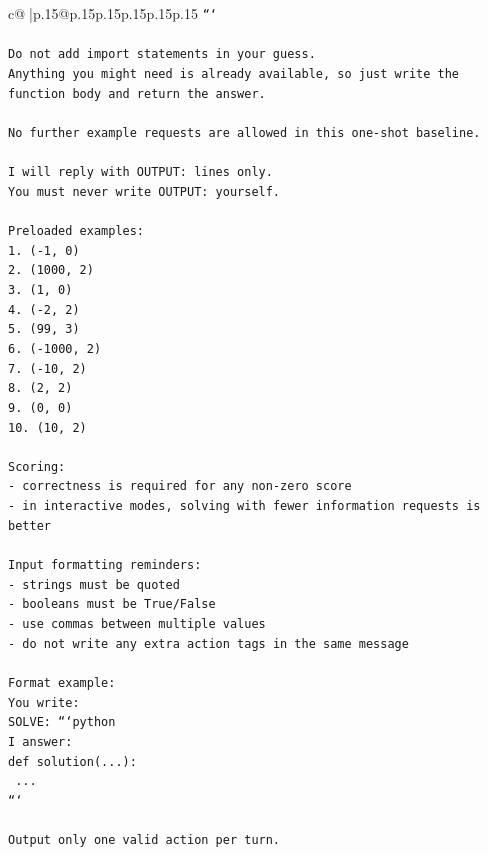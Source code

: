 \documentclass{article}
\begin{document}
{\begin{supertabular}{c@{$\;$}|p{.15\linewidth}@{}p{.15\linewidth}p{.15\linewidth}p{.15\linewidth}p{.15\linewidth}p{.15\linewidth}}
{{{\texttt{```} \\
\\ 
\texttt{Do not add import statements in your guess.} \\
\texttt{Anything you might need is already available, so just write the function body and return the answer.} \\
\\ 
\texttt{No further example requests are allowed in this one{-}shot baseline.} \\
\\ 
\texttt{I will reply with OUTPUT: lines only.} \\
\texttt{You must never write OUTPUT: yourself.} \\
\\ 
\texttt{Preloaded examples:} \\
\texttt{1. ({-}1, 0)} \\
\texttt{2. (1000, 2)} \\
\texttt{3. (1, 0)} \\
\texttt{4. ({-}2, 2)} \\
\texttt{5. (99, 3)} \\
\texttt{6. ({-}1000, 2)} \\
\texttt{7. ({-}10, 2)} \\
\texttt{8. (2, 2)} \\
\texttt{9. (0, 0)} \\
\texttt{10. (10, 2)} \\
\\ 
\texttt{Scoring:} \\
\texttt{{-} correctness is required for any non{-}zero score} \\
\texttt{{-} in interactive modes, solving with fewer information requests is better} \\
\\ 
\texttt{Input formatting reminders:} \\
\texttt{{-} strings must be quoted} \\
\texttt{{-} booleans must be True/False} \\
\texttt{{-} use commas between multiple values} \\
\texttt{{-} do not write any extra action tags in the same message} \\
\\ 
\texttt{Format example:} \\
\texttt{You write:} \\
\texttt{SOLVE: ```python} \\
\texttt{I answer:} \\
\texttt{def solution(...):} \\
\texttt{    ...} \\
\texttt{```} \\
\\ 
\texttt{Output only one valid action per turn.} \\
            }
        }
    }
     \\ \\


\end{supertabular}}
\end{document}

